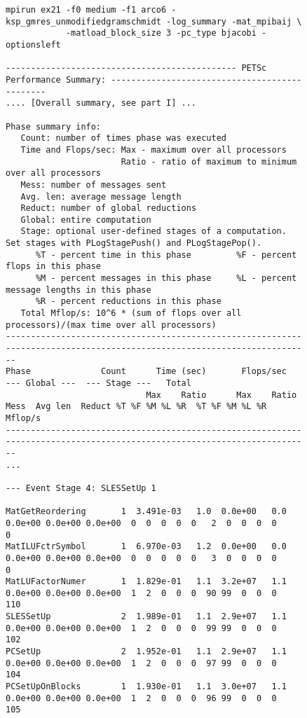 \begin{figure}[tb]
{\tiny
\begin{verbatim}
mpirun ex21 -f0 medium -f1 arco6 -ksp_gmres_unmodifiedgramschmidt -log_summary -mat_mpibaij \
            -matload_block_size 3 -pc_type bjacobi -optionsleft

---------------------------------------------- PETSc Performance Summary: ----------------------------------------------
.... [Overall summary, see part I] ...

Phase summary info:
   Count: number of times phase was executed
   Time and Flops/sec: Max - maximum over all processors
                       Ratio - ratio of maximum to minimum over all processors
   Mess: number of messages sent
   Avg. len: average message length
   Reduct: number of global reductions
   Global: entire computation
   Stage: optional user-defined stages of a computation. Set stages with PLogStagePush() and PLogStagePop().
      %T - percent time in this phase         %F - percent flops in this phase
      %M - percent messages in this phase     %L - percent message lengths in this phase
      %R - percent reductions in this phase
   Total Mflop/s: 10^6 * (sum of flops over all processors)/(max time over all processors)
------------------------------------------------------------------------------------------------------------------------
Phase              Count      Time (sec)       Flops/sec                          --- Global ---  --- Stage ---   Total
                            Max    Ratio      Max    Ratio  Mess  Avg len  Reduct %T %F %M %L %R  %T %F %M %L %R Mflop/s
------------------------------------------------------------------------------------------------------------------------
...
 
--- Event Stage 4: SLESSetUp 1

MatGetReordering       1  3.491e-03   1.0  0.0e+00   0.0  0.0e+00 0.0e+00 0.0e+00  0  0  0  0  0   2  0  0  0  0     0
MatILUFctrSymbol       1  6.970e-03   1.2  0.0e+00   0.0  0.0e+00 0.0e+00 0.0e+00  0  0  0  0  0   3  0  0  0  0     0
MatLUFactorNumer       1  1.829e-01   1.1  3.2e+07   1.1  0.0e+00 0.0e+00 0.0e+00  1  2  0  0  0  90 99  0  0  0   110
SLESSetUp              2  1.989e-01   1.1  2.9e+07   1.1  0.0e+00 0.0e+00 0.0e+00  1  2  0  0  0  99 99  0  0  0   102
PCSetUp                2  1.952e-01   1.1  2.9e+07   1.1  0.0e+00 0.0e+00 0.0e+00  1  2  0  0  0  97 99  0  0  0   104
PCSetUpOnBlocks        1  1.930e-01   1.1  3.0e+07   1.1  0.0e+00 0.0e+00 0.0e+00  1  2  0  0  0  96 99  0  0  0   105


\end{verbatim}}
\end{figure}
